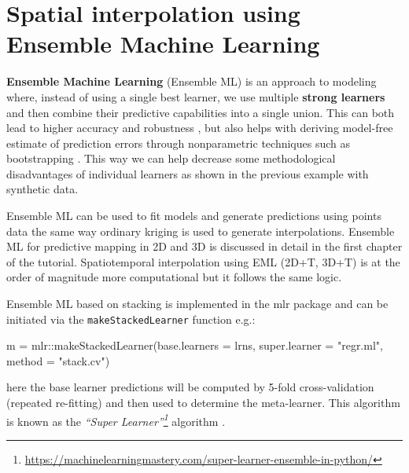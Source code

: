 \documentclass[
  graybox,natbib,nospthms]{svmono}
\newenvironment{Shaded}{\begin{snugshade}}{\end{snugshade}}
\newcommand{\AttributeTok}[1]{\textcolor[rgb]{0.61,0.61,0.61}{#1}}
\newcommand{\FunctionTok}[1]{\textcolor[rgb]{0,0,0}{#1}}
\newcommand{\NormalTok}[1]{#1}
\newcommand{\OtherTok}[1]{\textcolor[rgb]{0.37,0.37,0.37}{#1}}
\newcommand{\SpecialCharTok}[1]{\textcolor[rgb]{0,0,0}{#1}}
\newcommand{\StringTok}[1]{\textcolor[rgb]{0.5,0.5,0.5}{#1}}
\renewcommand{\href}[2]{#2 (\url{#1})}
\renewcommand{\href}[2]{#2\footnote{\url{#1}}}
\begin{document}
\hypertarget{spatial-interpolation-using-ensemble-machine-learning}{%
\section{Spatial interpolation using Ensemble Machine Learning}\label{spatial-interpolation-using-ensemble-machine-learning}}

\textbf{Ensemble Machine Learning} (Ensemble ML) is an approach to modeling where, instead of using a
single best learner, we use multiple \textbf{strong learners} and then combine their
predictive capabilities into a single union. This can both lead to higher
accuracy and robustness \citep{seni2010ensemble}, but also helps with deriving
model-free estimate of prediction errors through nonparametric techniques such as
bootstrapping \citep{zhang2012ensemble}. This way we can help decrease some methodological disadvantages of
individual learners as shown in the previous example with synthetic data.

Ensemble ML can be used to fit models and generate predictions using points data
the same way ordinary kriging is used to generate interpolations. Ensemble ML
for predictive mapping in 2D and 3D is discussed in detail in the first chapter
of the tutorial. Spatiotemporal interpolation using EML (2D+T, 3D+T) is at the
order of magnitude more computational \citep{gasch2015spatio} but it follows the same logic.

Ensemble ML based on stacking is implemented in the mlr package \citep{bischl2016mlr}
and can be initiated via the \texttt{makeStackedLearner} function e.g.:

\begin{Shaded}
\begin{Highlighting}[]
\NormalTok{m }\OtherTok{=}\NormalTok{ mlr}\SpecialCharTok{::}\FunctionTok{makeStackedLearner}\NormalTok{(}\AttributeTok{base.learners =}\NormalTok{ lrns, }
              \AttributeTok{super.learner =} \StringTok{"regr.ml"}\NormalTok{, }\AttributeTok{method =} \StringTok{"stack.cv"}\NormalTok{)}
\end{Highlighting}
\end{Shaded}

here the base learner predictions will be computed by 5-fold cross-validation
(repeated re-fitting) and then used to determine the meta-learner. This algorithm
is known as the \emph{\href{https://machinelearningmastery.com/super-learner-ensemble-in-python/}{``Super Learner''}} algorithm \citep{Polley2010}.
\end{document}
